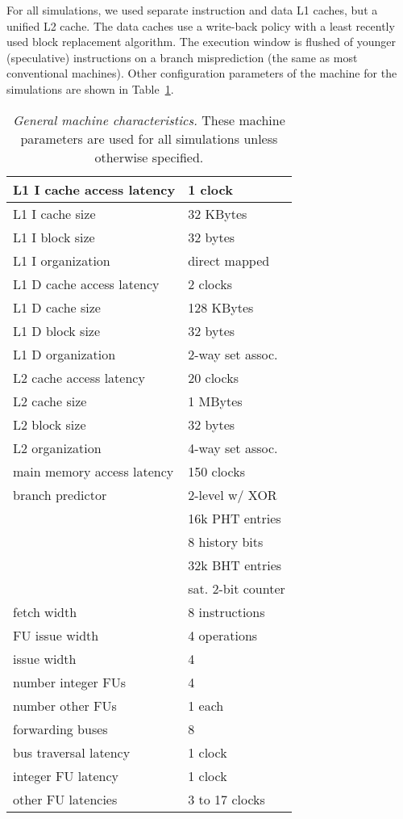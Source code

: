 \documentclass[10pt,twocolumn,dvips]{article}
\begin{document}
For all simulations, we used separate instruction and
data L1 caches, but a unified L2 cache.
The data caches use a write-back policy with a least recently used
block replacement algorithm.
The execution window is flushed of younger (speculative) instructions
on a branch misprediction (the same as most conventional machines).
Other configuration parameters of the machine for the
simulations are shown in Table~\ref{tab:baseline}.

%
\begin{table}
\begin{center}
\caption{{\em General machine characteristics.}
These machine parameters are used for all simulations
unless otherwise specified.}
\label{tab:baseline}
\scriptsize{
\begin{tabular}{|l|l|}
\hline 
L1 I cache access latency&1 clock\\
\hline
L1 I cache size&32 KBytes\\
\hline
L1 I block size&32 bytes\\
\hline
L1 I organization&direct mapped\\
%
\hline 
L1 D cache access latency&2 clocks\\
\hline
L1 D cache size&128 KBytes\\
\hline
L1 D block size&32 bytes\\
\hline
L1 D organization&2-way set assoc.\\
%
\hline
L2 cache access latency&20 clocks\\
\hline
L2 cache size&1 MBytes\\
\hline
L2 block size&32 bytes\\
\hline
L2 organization&4-way set assoc.\\
%
\hline
main memory access latency&150 clocks\\
\hline
branch predictor&2-level w/ XOR\\
\cline{2-2}
 & 16k PHT entries\\
\cline{2-2}
 & 8 history bits\\
\cline{2-2}
 & 32k BHT entries\\
\cline{2-2}
 & sat. 2-bit counter\\
\hline
fetch width & 8 instructions \\
\hline
FU issue width & 4 operations \\
\hline
issue width & 4 \\
\hline
number integer FUs & 4 \\
\hline
number other FUs & 1 each \\
\hline
forwarding buses & 8 \\
\hline
bus traversal latency & 1 clock \\
\hline
integer FU latency & 1 clock \\
\hline
other FU latencies & 3 to 17 clocks \\
\hline 
\end{tabular}
}
\end{center}
\end{table}
%
\end{document}
